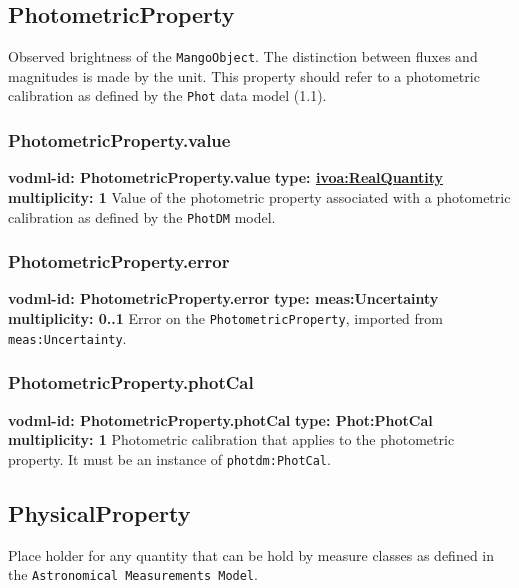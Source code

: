   \subsection{PhotometricProperty}
  \label{sect:PhotometricProperty}
    Observed brightness of the \texttt{MangoObject}. The distinction between fluxes and magnitudes is made by the unit. This property should refer to a photometric calibration as defined by the \texttt{Phot} data model (1.1).

    \subsubsection{PhotometricProperty.value}
      \textbf{vodml-id: PhotometricProperty.value} \newline
      \textbf{type: \hyperref[sect:ivoa]{ivoa:RealQuantity}} \newline
      \textbf{multiplicity: 1} \newline
      Value of the photometric property associated with a photometric calibration as defined by the \texttt{PhotDM} model.

    \subsubsection{PhotometricProperty.error}
      \textbf{vodml-id: PhotometricProperty.error} \newline
      \textbf{type: meas:Uncertainty} \newline
      \textbf{multiplicity: 0..1} \newline
      Error on the \texttt{PhotometricProperty}, imported from \texttt{meas:Uncertainty}.

    \subsubsection{PhotometricProperty.photCal}
      \textbf{vodml-id: PhotometricProperty.photCal} \newline
      \textbf{type: Phot:PhotCal} \newline
      \textbf{multiplicity: 1} \newline
      Photometric calibration that applies to the photometric property. It must be an instance of \texttt{photdm:PhotCal}.

  \subsection{PhysicalProperty}
  \label{sect:PhysicalProperty}
    Place holder for any quantity that can be hold by measure classes as defined in the \texttt{Astronomical Measurements Model}.

